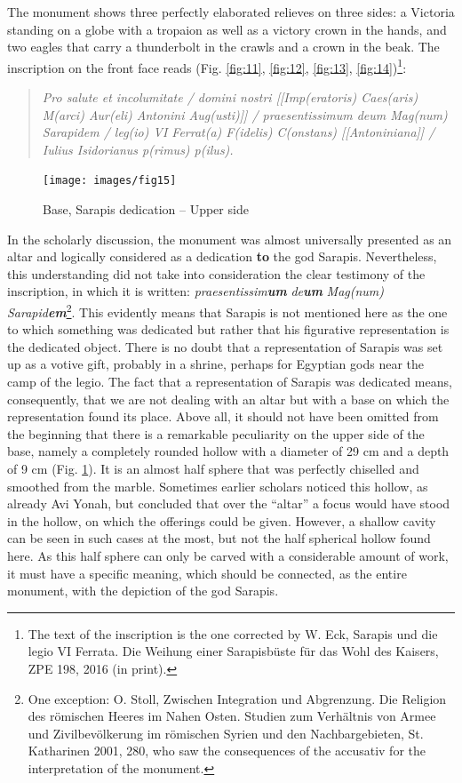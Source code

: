 \documentclass[amsthm,ebook]{saparticle}
\begin{document}
The monument shows three perfectly elaborated relieves on three sides: a Victoria 
standing on a globe with a tropaion as well as a victory crown in the hands, and 
two eagles that carry a thunderbolt in the crawls and a crown in the beak. The 
inscription on the front face reads (Fig. \ref{fig:11}, \ref{fig:12}, \ref{fig:13}, \ref{fig:14})\footnote{The text of the inscription is the one corrected by W. Eck, Sarapis und die legio VI Ferrata. Die Weihung einer Sarapisbüste für das Wohl des Kaisers, ZPE 198, 2016 (in print).}:

\begin{quotation}
\textit{Pro salute et incolumitate / domini nostri [[Imp(eratoris) Caes(aris) M(arci) 
Aur(eli) Antonini Aug(usti)]] / praesentissimum deum Mag(num) Sarapidem / leg(io) 
VI Ferrat(a) F(idelis) C(onstans) [[Antoniniana]] / Iulius Isidorianus p(rimus) 
p(ilus).}
\end{quotation}

\begin{figure}[!bp]
\centering
 \texttt{[image: images/fig15]}
\caption{Base, Sarapis dedication -- Upper side}
\label{fig:15}
\end{figure}

In the scholarly discussion, the monument was almost universally presented as an 
altar and logically considered as a dedication \textbf{to} the god Sarapis.\textbf{ 
}Nevertheless, this understanding did not take into consideration the clear testimony 
of the inscription, in which it is written: \textit{praesentissim}\textit{\textbf{um}}\textit{ 
de}\textit{\textbf{um}}\textit{ Mag(num) Sarapid}\textit{\textbf{em}}\footnote{One exception: O. Stoll, Zwischen Integration und Abgrenzung. Die Religion des römischen Heeres im Nahen Osten. Studien zum Verhältnis von Armee und Zivilbevölkerung im römischen Syrien und den Nachbargebieten, St. Katharinen 2001, 280, who saw the consequences of the accusativ for the interpretation of the monument.}. This evidently 
means that Sarapis is not mentioned here as the one to which something was dedicated 
but rather that his figurative representation is the dedicated object. There is 
no doubt that a representation of Sarapis was set up as a votive gift, probably 
in a shrine, perhaps for Egyptian gods near the camp of the legio. The fact that 
a representation of Sarapis was dedicated means, consequently, that we are not 
dealing with an altar but with a base on which the representation found its place. 
Above all, it should not have been omitted from the beginning that there is a remarkable 
peculiarity on the upper side of the base,\textbf{ }namely a completely rounded 
hollow with a diameter of 29 cm and a depth of 9 cm (Fig. \ref{fig:15}). It is an almost 
half sphere that was perfectly chiselled and smoothed from the marble. Sometimes 
earlier scholars noticed this hollow, as already Avi Yonah, but concluded that 
over the ``altar'' a focus would have stood in the hollow, on which the offerings 
could be given. However, a shallow cavity can be seen in such cases at the most, 
but not the half spherical hollow found here. As this half sphere can only be carved 
with a considerable amount of work, it must have a specific meaning, which should 
be connected, as the entire monument, with the depiction of the god Sarapis.   
\end{document}
